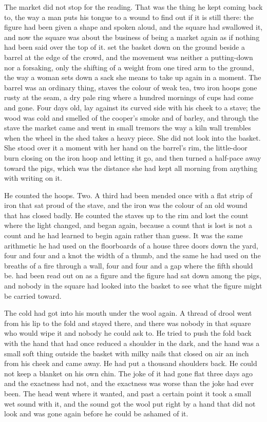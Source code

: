 The market did not stop for the reading. That was the thing he kept coming back to, the way a man puts his tongue to a wound to find out if it is still there: the figure had been given a shape and spoken aloud, and the square had swallowed it, and now the square was about the business of being a market again as if nothing had been said over the top of it.  set the basket down on the ground beside a barrel at the edge of the crowd, and the movement was neither a putting-down nor a forsaking, only the shifting of a weight from one tired arm to the ground, the way a woman sets down a sack she means to take up again in a moment. The barrel was an ordinary thing, staves the colour of weak tea, two iron hoops gone rusty at the seam, a dry pale ring where a hundred mornings of cups had come and gone. Four days old,  lay against its curved side with his cheek to a stave; the wood was cold and smelled of the cooper's smoke and of barley, and through the stave the market came and went in small tremors the way a kiln wall trembles when the wheel in the shed takes a heavy piece. She did not look into the basket. She stood over it a moment with her hand on the barrel's rim, the little-door burn closing on the iron hoop and letting it go, and then turned a half-pace away toward the pigs, which was the distance she had kept all morning from anything with writing on it.

He counted the hoops. Two. A third had been mended once with a flat strip of iron that sat proud of the stave, and the iron was the colour of an old wound that has closed badly. He counted the staves up to the rim and lost the count where the light changed, and began again, because a count that is lost is not a count and he had learned to begin again rather than guess. It was the same arithmetic he had used on the floorboards of a house three doors down the yard, four and four and a knot the width of a thumb, and the same he had used on the breaths of a fire through a wall, four and four and a gap where the fifth should be.  had been read out on  as a figure and the figure had sat down among the pigs, and nobody in the square had looked into the basket to see what the figure might be carried toward.

The cold had got into his mouth under the wool again. A thread of drool went from his lip to the fold and stayed there, and there was nobody in that square who would wipe it and nobody he could ask to. He tried to push the fold back with the hand that had once reduced a shoulder in the dark, and the hand was a small soft thing outside the basket with milky nails that closed on air an inch from his cheek and came away. He had put a thousand shoulders back. He could not keep a blanket on his own chin. The joke of it had gone flat three days ago and the exactness had not, and the exactness was worse than the joke had ever been. The head went where it wanted, and past a certain point it took a small wet sound with it, and the sound got the wool put right by a hand that did not look and was gone again before he could be ashamed of it.

